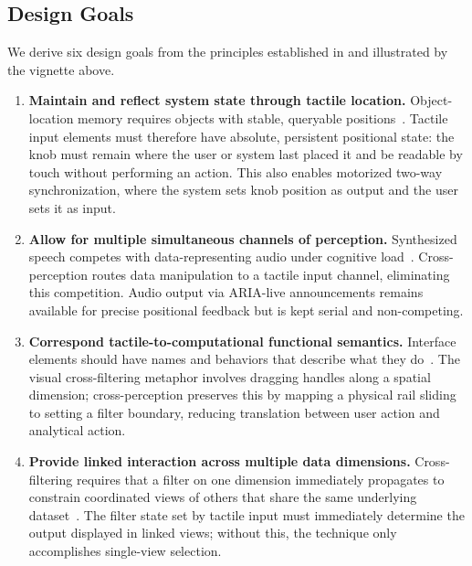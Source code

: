 \documentclass[12pt]{cmuthesis}
\begin{document}
\subsection{Design Goals} 

We derive six design goals from the principles established in  and illustrated by the vignette above.

\begin{enumerate}[label=\textbf{G\arabic*:}, leftmargin=0pt, itemindent=!, itemsep=0pt, topsep=0pt, parsep=0pt]

\item \label{goal:G1}\textbf{Maintain and reflect system state through tactile location.} Object-location memory requires objects with stable, queryable positions~\cite{GarciaNavarra2025, Llana2025}. Tactile input elements must therefore have absolute, persistent positional state: the knob must remain where the user or system last placed it and be readable by touch without performing an action. This also enables motorized two-way synchronization, where the system sets knob position as output and the user sets it as input.

\item \label{goal:G2}\textbf{Allow for multiple simultaneous channels of perception.} Synthesized speech competes with data-representing audio under cognitive load~\cite{Gherri2011}. Cross-perception routes data manipulation to a tactile input channel, eliminating this competition. Audio output via ARIA-live announcements remains available for precise positional feedback but is kept serial and non-competing.

\item \label{goal:G3}\textbf{Correspond tactile-to-computational functional semantics.} Interface elements should have names and behaviors that describe what they do~\cite{WAI2008, Elavsky2022Chartability}. The visual cross-filtering metaphor involves dragging handles along a spatial dimension; cross-perception preserves this by mapping a physical rail sliding to setting a filter boundary, reducing translation between user action and analytical action.

\item \label{goal:G4}\textbf{Provide linked interaction across multiple data dimensions.} Cross-filtering requires that a filter on one dimension immediately propagates to constrain coordinated views of others that share the same underlying dataset~\cite{buja1991interactive, ahlberg1994visual}. The filter state set by tactile input must immediately determine the output displayed in linked views; without this, the technique only accomplishes single-view selection.


\end{enumerate}
\end{document}
